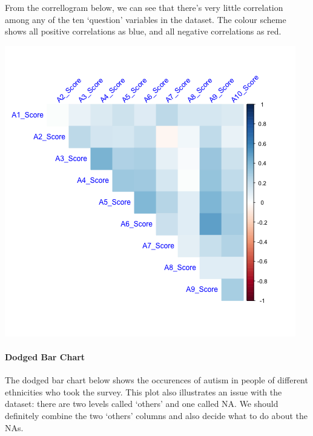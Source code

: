 \documentclass[]{article}
\let\oldparagraph\paragraph
\renewcommand{\paragraph}[1]{\oldparagraph{#1}\mbox{}}
\begin{document}
From the correllogram below, we can see that there's very little
correlation among any of the ten `question' variables in the dataset.
The colour scheme shows all positive correlations as blue, and all
negative correlations as red.

\includegraphics{../images/correlation.png}

\hypertarget{dodged-bar-chart}{%
\paragraph{Dodged Bar Chart}\label{dodged-bar-chart}}

The dodged bar chart below shows the occurences of autism in people of
different ethnicities who took the survey. This plot also illustrates an
issue with the dataset: there are two levels called `others' and one
called NA. We should definitely combine the two `others' columns and
also decide what to do about the NAs.
\end{document}
